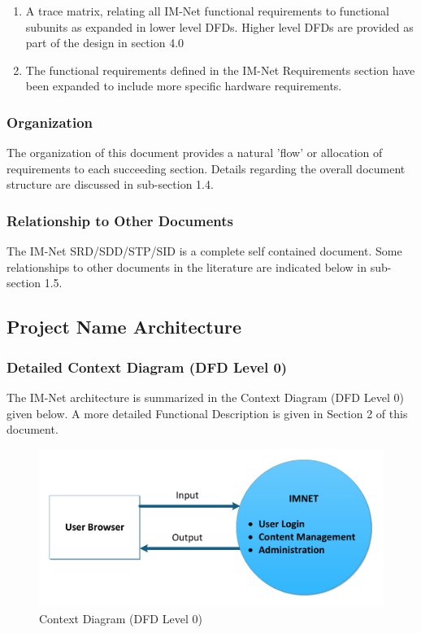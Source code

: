 \documentclass[letterpaper,12pt]{article}
\begin{document}
{\begin{enumerate}
\item  A trace matrix, relating all IM-Net functional requirements to functional subunits as expanded in lower level DFDs. Higher level DFDs are provided as part of the design in section 4.0

\item  The functional requirements defined in the IM-Net Requirements section have been expanded to include more specific hardware requirements.
\end{enumerate}

\textcolor{subsubsection}{\subsubsection{Organization}}

The organization of this document provides a natural 'flow' or allocation of requirements to each succeeding section. Details regarding the overall document structure are discussed in sub-section 1.4.

\textcolor{subsubsection}{\subsubsection{Relationship to Other Documents}}

The IM-Net SRD/SDD/STP/SID is a complete self contained document. Some relationships to other documents in the literature are indicated below in sub-section 1.5.

\textcolor{subsection}{\subsection{Project Name Architecture}}
 
\textcolor{subsubsection}{\subsubsection{Detailed Context Diagram (DFD Level 0)}}

The IM-Net architecture is summarized in the Context Diagram (DFD Level 0) given below. A more detailed Functional Description is given in Section 2 of this document.\\

\begin{figure}[h]
\centering
\includegraphics[scale=0.9]{DFD_level_0.pdf}
\caption{Context Diagram (DFD Level 0)}
\label{fig:DFD_level_0}
\end{figure}

}
\end{document}
